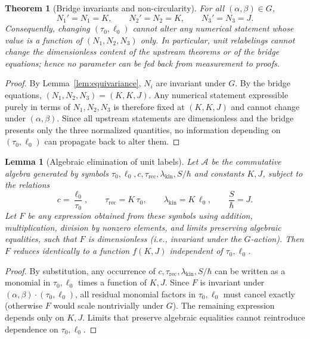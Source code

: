 \documentclass[11pt]{article}
\theoremstyle{plain}
\newtheorem{theorem}{Theorem}
\newtheorem{lemma}{Lemma}
\theoremstyle{definition}
\theoremstyle{remark}
\begin{document}
\begin{theorem}[Bridge invariants and non-circularity]\label{thm:nocirc}
For all \((\alpha,\beta)\in G\),
\[
N_{1}'=N_{1}=K,\qquad N_{2}'=N_{2}=K,\qquad N_{3}'=N_{3}=J.
\]
Consequently, changing \((\tau_{0},\ell_{0})\) cannot alter any numerical statement whose value is a function of \((N_{1},N_{2},N_{3})\) only. In particular, unit relabelings cannot change the dimensionless content of the upstream theorems or of the bridge equations; hence no parameter can be fed back from measurement to proofs.
\end{theorem}

\begin{proof}
By Lemma~\ref{lem:equivariance}, \(N_{i}\) are invariant under \(G\). By the bridge equations, \((N_{1},N_{2},N_{3})=(K,K,J)\). Any numerical statement expressible purely in terms of \(N_{1},N_{2},N_{3}\) is therefore fixed at \((K,K,J)\) and cannot change under \((\alpha,\beta)\). Since all upstream statements are dimensionless and the bridge presents only the three normalized quantities, no information depending on \((\tau_{0},\ell_{0})\) can propagate back to alter them.
\end{proof}

\begin{lemma}[Algebraic elimination of unit labels]\label{lem:elimination}
Let \(\mathcal{A}\) be the commutative algebra generated by symbols \(\tau_{0},\ell_{0},c,\tau_{\mathrm{rec}},\lambda_{\mathrm{kin}},S/\hbar\) and constants \(K,J\), subject to the relations
\[
c=\frac{\ell_{0}}{\tau_{0}},\qquad \tau_{\mathrm{rec}}=K\,\tau_{0},\qquad \lambda_{\mathrm{kin}}=K\,\ell_{0},\qquad \frac{S}{\hbar}=J.
\]
Let \(F\) be any expression obtained from these symbols using addition, multiplication, division by nonzero elements, and limits preserving algebraic equalities, such that \(F\) is dimensionless (i.e., invariant under the \(G\)-action). Then \(F\) reduces identically to a function \(f(K,J)\) independent of \(\tau_{0},\ell_{0}\).
\end{lemma}

\begin{proof}
By substitution, any occurrence of \(c,\tau_{\mathrm{rec}},\lambda_{\mathrm{kin}},S/\hbar\) can be written as a monomial in \(\tau_{0},\ell_{0}\) times a function of \(K,J\). Since \(F\) is invariant under \((\alpha,\beta)\cdot(\tau_{0},\ell_{0})\), all residual monomial factors in \(\tau_{0},\ell_{0}\) must cancel exactly (otherwise \(F\) would scale nontrivially under \(G\)). The remaining expression depends only on \(K,J\). Limits that preserve algebraic equalities cannot reintroduce dependence on \(\tau_{0},\ell_{0}\).
\end{proof}
\end{document}
